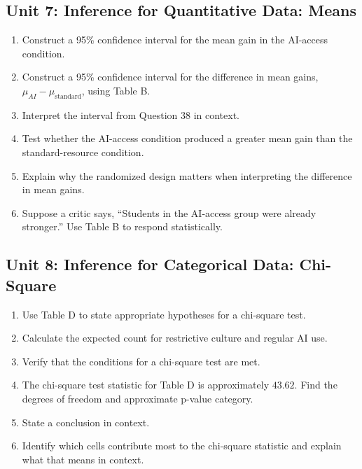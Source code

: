 \documentclass[11pt]{article}
\begin{document}
\subsection*{Unit 7: Inference for Quantitative Data: Means}
\begin{enumerate}[resume,leftmargin=*]
\item Construct a 95\% confidence interval for the mean gain in the
AI-access condition.
\item Construct a 95\% confidence interval for the difference in mean
gains, $\mu_{AI} - \mu_{\text{standard}}$, using Table B.
\item Interpret the interval from Question 38 in context.
\item Test whether the AI-access condition produced a greater mean
gain than the standard-resource condition.
\item Explain why the randomized design matters when interpreting the
difference in mean gains.
\item Suppose a critic says, ``Students in the AI-access group were
already stronger.'' Use Table B to respond statistically.
\end{enumerate}

\subsection*{Unit 8: Inference for Categorical Data: Chi-Square}
\begin{enumerate}[resume,leftmargin=*]
\item Use Table D to state appropriate hypotheses for a chi-square test.
\item Calculate the expected count for restrictive culture and
regular AI use.
\item Verify that the conditions for a chi-square test are met.
\item The chi-square test statistic for Table D is approximately
$43.62$. Find the degrees of freedom and approximate p-value
category.
\item State a conclusion in context.
\item Identify which cells contribute most to the chi-square
statistic and explain what that means in context.
\end{enumerate}
\end{document}
